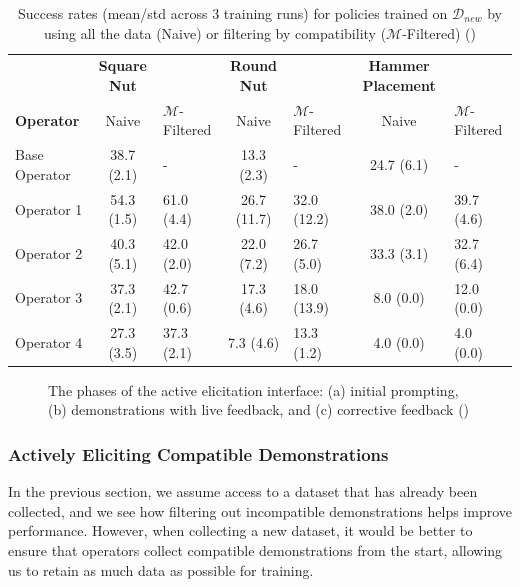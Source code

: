 \documentclass[
  letterpaper,
  numbers=noenddot,
  DIV=11]{scrreprt}
\theoremstyle{plain}
\theoremstyle{definition}
\theoremstyle{plain}
\theoremstyle{remark}
\begin{document}
\begin{longtable}[]{@{}lclclcl@{}}
\caption{Success rates (mean/std across 3 training runs) for policies
trained on \(\mathcal{D}_{new}\) by using all the data (Naive) or
filtering by compatibility (\(\mathcal{M}\)-Filtered)
()}\label{tbl-m_filter_table}\tabularnewline
\toprule\noalign{}
\endfirsthead
\endhead
\bottomrule\noalign{}
\endlastfoot
& \textbf{Square Nut} & & \textbf{Round Nut} & & \textbf{Hammer
Placement} & \\
\textbf{Operator} & Naive & \(\mathcal{M}\)-Filtered & Naive &
\(\mathcal{M}\)-Filtered & Naive & \(\mathcal{M}\)-Filtered \\
Base Operator & 38.7 (2.1) & - & 13.3 (2.3) & - & 24.7 (6.1) & - \\
Operator 1 & 54.3 (1.5) & 61.0 (4.4) & 26.7 (11.7) & 32.0 (12.2) & 38.0
(2.0) & 39.7 (4.6) \\
Operator 2 & 40.3 (5.1) & 42.0 (2.0) & 22.0 (7.2) & 26.7 (5.0) & 33.3
(3.1) & 32.7 (6.4) \\
Operator 3 & 37.3 (2.1) & 42.7 (0.6) & 17.3 (4.6) & 18.0 (13.9) & 8.0
(0.0) & 12.0 (0.0) \\
Operator 4 & 27.3 (3.5) & 37.3 (2.1) & 7.3 (4.6) & 13.3 (1.2) & 4.0
(0.0) & 4.0 (0.0) \\
\end{longtable}

\begin{figure}


\caption{\label{fig-active_elicitation}The phases of the active
elicitation interface: (a) initial prompting, (b) demonstrations with
live feedback, and (c) corrective feedback
()}

\end{figure}%

\subsubsection*{Actively Eliciting Compatible
Demonstrations}\label{actively-eliciting-compatible-demonstrations}

In the previous section, we assume access to a dataset that has already
been collected, and we see how filtering out incompatible demonstrations
helps improve performance. However, when collecting a new dataset, it
would be better to ensure that operators collect compatible
demonstrations from the start, allowing us to retain as much data as
possible for training.
\end{document}
